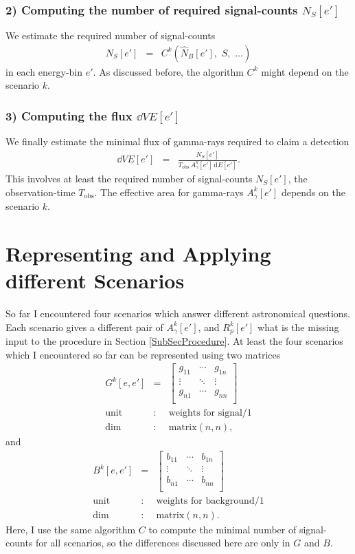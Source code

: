\documentclass{article}%
\begin{document}
\subsubsection*{2) Computing the number of required signal-counts $N_S[e']$}
%
We estimate the required number of signal-counts
\begin{eqnarray}
N_S[e'] &=& C^k(\hat{N}_B[e'],\,\,S,\,\,\dots)
\end{eqnarray}
in each energy-bin $e'$. As discussed before, the algorithm $C^k$ might depend on the scenario $k$.
%
\subsubsection*{3) Computing the flux $\dd{V}{E}[e']$}
%
We finally estimate the minimal flux of gamma-rays required to claim a detection
%
\begin{eqnarray}
\dd{V}{E}[e'] &=& \frac{N_S[e']}{{T_\text{obs}}\,{A^k_\gamma}[e']\,\text{d}E[e']}.
\end{eqnarray}
%
This involves at least the required number of signal-counts $N_S[e']$, the observation-time $T_\text{obs}$.
%
The effective area for gamma-rays $A^k_\gamma[e']$ depends on the scenario $k$.
%
\section{Representing and Applying different Scenarios}
%
So far I encountered four scenarios which answer different astronomical questions.
%
Each scenario gives a different pair of $A^k_\gamma[e']$, and $R^k_p[e']$ what is the missing input to the procedure in Section \ref{SubSecProcedure}.
%
At least the four scenarios which I encountered so far can be represented using two matrices
%
\begin{eqnarray*}
G^k[e, e'] &=&
  \left[ {\begin{array}{ccc}
    g_{11} & \cdots & g_{1n}\\
    \vdots & \ddots & \vdots\\
    g_{n1} & \cdots & g_{nn}\\
  \end{array} } \right]\\
\text{unit} &:& \text{weights for signal}/1\\
\text{dim} &:& \text{matrix}(n,n),
\end{eqnarray*}
%
and
%
\begin{eqnarray*}
B^k[e, e'] &=&
  \left[ {\begin{array}{cccc}
    b_{11} & \cdots & b_{1n}\\
    \vdots & \ddots & \vdots\\
    b_{n1} & \cdots & b_{nn}\\
  \end{array} } \right]\\
\text{unit} &:& \text{weights for background}/1\\
\text{dim} &:& \text{matrix}(n,n).
\end{eqnarray*}
%
Here, I use the same algorithm $C$ to compute the minimal number of signal-counts for all scenarios, so the differences discussed here are only in $G$ and $B$.
%
\end{document}
